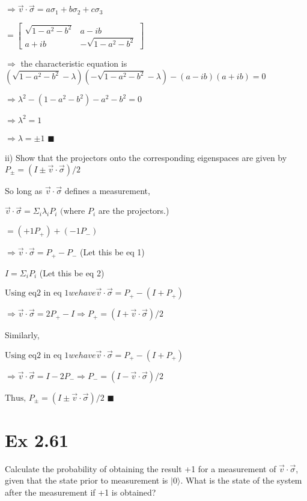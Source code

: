 \documentclass{article}
\newcommand{\0}{{$|0\rangle$}}
\newcommand{\1}{{$|1\rangle$}}
\newcommand{\2}{\frac{1}{\sqrt{2}}}
\newcommand{\lam}{\lambda}
\begin{document}
$\Rightarrow \vec{v} \cdot \vec{\sigma} = a\sigma_1 + b\sigma_2 + c\sigma_3$

$ = \begin{bmatrix} \sqrt{1 - a^2 - b^2} & a - ib \\ a + ib & -\sqrt{1 - a^2 - b^2} \end{bmatrix}$

$\Rightarrow $ the characteristic equation is 
$ (\sqrt{1 - a^2 -b^2} -\lam)(- \sqrt{1 - a^2 - b^2} - \lam) - (a-ib)(a+ib) = 0$

$ \Rightarrow \lam ^2 - (1 -a^2 -b^2) -a^2 -b^2= 0$

$ \Rightarrow \lam^2 = 1$

$\Rightarrow \lam = \pm 1$
$\blacksquare$

ii) Show that the projectors onto the corresponding eigenspaces are given by $P_{\pm} = (I \pm \vec{v} \cdot \vec{\sigma})/2$

So long as $\vec{v} \cdot \vec{\sigma}$ defines a measurement, 

$\vec{v} \cdot \vec{\sigma} = \Sigma_i \lam_i P_i \text{ (where } P_i$ are the projectors.)

$ = (+1 P_+) + (-1 P_-)$

$ \Rightarrow \vec{v} \cdot \vec{\sigma} = P_+ - P_-$ (Let this be eq 1)

$ I = \Sigma_i P_i$ (Let this be eq 2)

$ \text{Using eq2 in eq 1} we have \vec{v} \cdot \vec{\sigma} = P_+ -(I + P_+)$

$ \Rightarrow \vec{v} \cdot \vec{\sigma} = 2P_+ - I \Rightarrow P_+ = (I + \vec{v} \cdot \vec{\sigma})/2$

Similarly,

$ \text{Using eq2 in eq 1} we have \vec{v} \cdot \vec{\sigma} = P_+ -(I + P_+)$

$ \Rightarrow \vec{v} \cdot \vec{\sigma} = I - 2P_- \Rightarrow P_- = (I - \vec{v} \cdot \vec{\sigma})/2$


$ \text{Thus, } P_\pm = (I \pm \vec{v} \cdot \vec{\sigma})/2$
$\blacksquare$


\newpage
\section*{Ex 2.61}
Calculate the probability of obtaining the result +1 for a measurement of $\vec{v} \cdot \vec{\sigma}$, given that the state prior to measurement is \0. What is the state of the system after the measurement if +1 is obtained?
\end{document}
